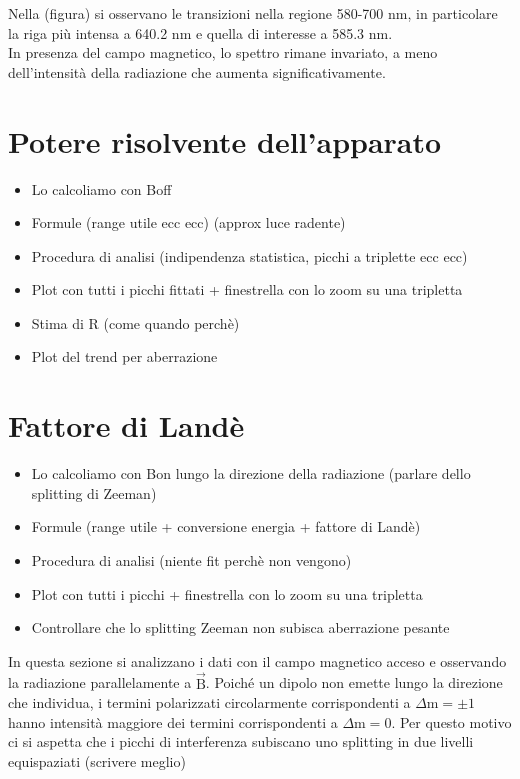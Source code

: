 \documentclass[twocolumn,10pt]{asme2ej}
\begin{document}
Nella (figura) si osservano le transizioni nella regione 580-700 \si{\nano \metre}, in particolare la riga più intensa 
a 640.2 \si{\nano \metre} e quella di interesse a 585.3 \si{\nano \metre}.\\
In presenza del campo magnetico, lo spettro rimane invariato, a meno dell'intensità della radiazione che aumenta significativamente. 

\section{Potere risolvente dell'apparato}

\begin{itemize}
    \item Lo calcoliamo con Boff
    \item Formule (range utile ecc ecc) (approx luce radente) 
    \item Procedura di analisi (indipendenza statistica, picchi a triplette ecc ecc)
    \item Plot con tutti i picchi fittati + finestrella con lo zoom su una tripletta
    \item Stima di R (come quando perchè)
    \item Plot del trend per aberrazione 
\end{itemize}



\section{Fattore di Landè}

\begin{itemize}
    \item Lo calcoliamo con Bon lungo la direzione della radiazione (parlare dello splitting di Zeeman)
    \item Formule (range utile + conversione energia + fattore di Landè)
    \item Procedura di analisi (niente fit perchè non vengono)
    \item Plot con tutti i picchi + finestrella con lo zoom su una tripletta 
    \item Controllare che lo splitting Zeeman non subisca aberrazione pesante
\end{itemize}
In questa sezione si analizzano i dati con il campo magnetico acceso e osservando la radiazione parallelamente a $\vec{\text{B}}$.
Poiché un dipolo non emette lungo la direzione che individua, i termini polarizzati circolarmente corrispondenti a $\Delta \text{m} = \pm 1$
hanno intensità maggiore dei termini corrispondenti a $\Delta \text{m} = 0$. Per questo motivo ci si aspetta che i picchi di interferenza subiscano 
uno splitting in due livelli equispaziati (scrivere meglio)
\end{document}
